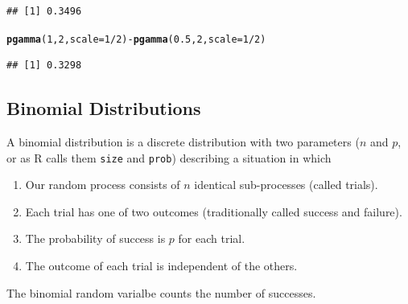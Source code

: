 \documentclass[twoside]{book}\usepackage[]{graphicx}\usepackage[]{xcolor}
\makeatletter
\newcommand{\hlnum}[1]{\textcolor[rgb]{0.686,0.059,0.569}{#1}}%
\newcommand{\hlopt}[1]{\textcolor[rgb]{0,0,0}{#1}}%
\newcommand{\hlstd}[1]{\textcolor[rgb]{0.345,0.345,0.345}{#1}}%
\newcommand{\hlkwc}[1]{\textcolor[rgb]{0.333,0.667,0.333}{#1}}%
\newcommand{\hlkwd}[1]{\textcolor[rgb]{0.737,0.353,0.396}{\textbf{#1}}}%
\newenvironment{kframe}{%
 \def\at@end@of@kframe{}%
 \ifinner\ifhmode%
  \def\at@end@of@kframe{\end{minipage}}%
  \begin{minipage}{\columnwidth}%
 \fi\fi%
 \def\FrameCommand##1{\hskip\@totalleftmargin \hskip-\fboxsep
 \colorbox{shadecolor}{##1}\hskip-\fboxsep
     \hskip-\linewidth \hskip-\@totalleftmargin \hskip\columnwidth}%
 \MakeFramed {\advance\hsize-\width
   \@totalleftmargin\z@ \linewidth\hsize
   \@setminipage}}%
 {\par\unskip\endMakeFramed%
 \at@end@of@kframe}
\newenvironment{knitrout}{}{} %
\makeatother
\begin{document}
\begin{solution}
\begin{knitrout}
\begin{kframe}
\begin{verbatim}
## [1] 0.3496
\end{verbatim}
\begin{alltt}
\hlkwd{pgamma}\hlstd{(}\hlnum{1}\hlstd{,} \hlnum{2}\hlstd{,} \hlkwc{scale} \hlstd{=} \hlnum{1}\hlopt{/}\hlnum{2}\hlstd{)}   \hlopt{-} \hlkwd{pgamma}\hlstd{(}\hlnum{0.5}\hlstd{,} \hlnum{2}\hlstd{,} \hlkwc{scale} \hlstd{=} \hlnum{1}\hlopt{/}\hlnum{2}\hlstd{)}
\end{alltt}
\begin{verbatim}
## [1] 0.3298
\end{verbatim}
\end{kframe}
\end{knitrout}
\end{solution}

\subsection{Binomial Distributions}

A binomial distribution is a discrete distribution with two parameters ($n$ and $p$,
or as R calls them \verb!size! and \verb!prob!) describing a situation in which
\begin{enumerate}
\item Our random process consists of $n$ identical sub-processes (called trials).
\item Each trial has one of two outcomes (traditionally called success and failure).
\item The probability of success is $p$ for each trial.
\item The outcome of each trial is independent of the others.
\end{enumerate}
The binomial random varialbe counts the number of successes.
\end{document}
